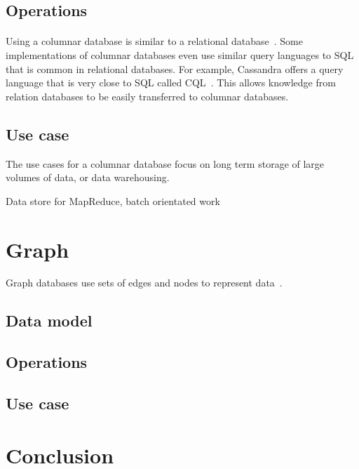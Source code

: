 \documentclass{CRPITStyle}
\renewcommand{\cite}{\citep}
\begin{document}
\subsection{Operations}

\paragraph{}
Using a columnar database is similar to a relational database~\cite{usingcolumn}.
Some implementations of columnar databases even use similar query languages to
SQL that is common in relational databases.
For example, Cassandra offers a query language that is very close to
SQL called CQL~\cite{cassandra}.
This allows knowledge from relation databases to be easily transferred to
columnar databases.

\subsection{Use case}

The use cases for a columnar database focus on long term storage of large
volumes of data, or data warehousing.

Data store for MapReduce, batch orientated work

\cite{nosql_performance}
\cite{bigtable}


\section{Graph}

Graph databases use sets of edges and nodes to represent
data~\cite{nosql_survey}.


\subsection{Data model}

\subsection{Operations}


\subsection{Use case}

\cite{nosql_performance}

\section{Conclusion}



\end{document}
